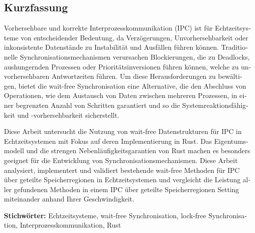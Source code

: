 \cleardoublepage

\begin{otherlanguage}{ngerman}
\chapter*{Kurzfassung}


Vorhersehbare und korrekte Interprozesskommunikation (IPC) ist für Echtzeitsysteme von entscheidender Bedeutung, da Verzögerungen, Unvorhersehbarkeit oder inkonsistente Datenstände zu Instabilität und Ausfällen führen können. Traditionelle Synchronisationsmechanismen verursachen Blockierungen, die zu Deadlocks, aushungernden Prozessen oder Prioritätsinversionen führen können, welche zu unvorhersehbaren Antwortzeiten führen. Um diese Herausforderungen zu bewältigen, bietet die wait-free Synchronisation eine Alternative, die den Abschluss von Operationen, wie dem Austausch von Daten zwischen mehreren Prozessen, in einer begrenzten Anzahl von Schritten garantiert und so die Systemreaktionsfähigkeit und -vorhersehbarkeit sicherstellt.

Diese Arbeit untersucht die Nutzung von wait-free Datenstrukturen für IPC in Echtzeitsystemen mit Fokus auf deren Implementierung in Rust. Das Eigentumsmodell und die strengen Nebenläufigkeitsgarantien von Rust machen es besonders geeignet für die Entwicklung von Synchronisationsmechanismen. Diese Arbeit analysiert, implementert und validiert bestehende wait-free Methoden für IPC über geteilte Speicherregionen in Echtzeitsystemen und vergleicht die Leistung aller gefundenen Methoden in einem IPC über geteilte Speicherregionen Setting miteinander anhand Ihrer Geschwindigkeit.

\vfill
\noindent\textbf{Stichwörter:} Echtzeitsysteme, wait-free Synchronisation, lock-free Synchronisation, Interprozesskommunikation, Rust
\vfill
\end{otherlanguage}
